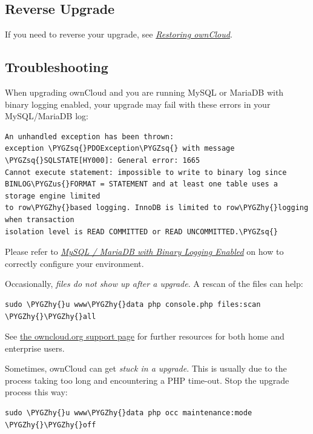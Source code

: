 \documentclass[letterpaper,10pt,english]{sphinxmanual}
\def\PYGZus{\char`\_}
\def\PYGZhy{\char`\-}
\def\PYGZsq{\char`\'}
\renewcommand\PYGZsq{\textquotesingle}
\begin{document}
\subsection{Reverse Upgrade}
\label{maintenance/upgrade:reverse-upgrade}
If you need to reverse your upgrade, see {\hyperref[maintenance/restore::doc]{\emph{\emph{Restoring ownCloud}}}}.


\subsection{Troubleshooting}
\label{maintenance/upgrade:troubleshooting}
When upgrading ownCloud and you are running MySQL or MariaDB with binary
logging enabled, your upgrade may fail with these errors in your MySQL/MariaDB log:

\begin{Verbatim}[commandchars=\\\{\}]
An unhandled exception has been thrown:
exception \PYGZsq{}PDOException\PYGZsq{} with message \PYGZsq{}SQLSTATE[HY000]: General error: 1665
Cannot execute statement: impossible to write to binary log since
BINLOG\PYGZus{}FORMAT = STATEMENT and at least one table uses a storage engine limited
to row\PYGZhy{}based logging. InnoDB is limited to row\PYGZhy{}logging when transaction
isolation level is READ COMMITTED or READ UNCOMMITTED.\PYGZsq{}
\end{Verbatim}

Please refer to {\hyperref[configuration_database/linux_database_configuration:db\string-binlog\string-label]{\emph{MySQL / MariaDB with Binary Logging Enabled}}} on how to correctly configure your
environment.

Occasionally, \emph{files do not show up after a upgrade}. A rescan of the files can
help:

\begin{Verbatim}[commandchars=\\\{\}]
sudo \PYGZhy{}u www\PYGZhy{}data php console.php files:scan \PYGZhy{}\PYGZhy{}all
\end{Verbatim}

See \href{https://owncloud.org/support}{the owncloud.org support page} for further
resources for both home and enterprise users.

Sometimes, ownCloud can get \emph{stuck in a upgrade}. This is usually due to the
process taking too long and encountering a PHP time-out. Stop the upgrade
process this way:

\begin{Verbatim}[commandchars=\\\{\}]
sudo \PYGZhy{}u www\PYGZhy{}data php occ maintenance:mode \PYGZhy{}\PYGZhy{}off
\end{Verbatim}
\end{document}
